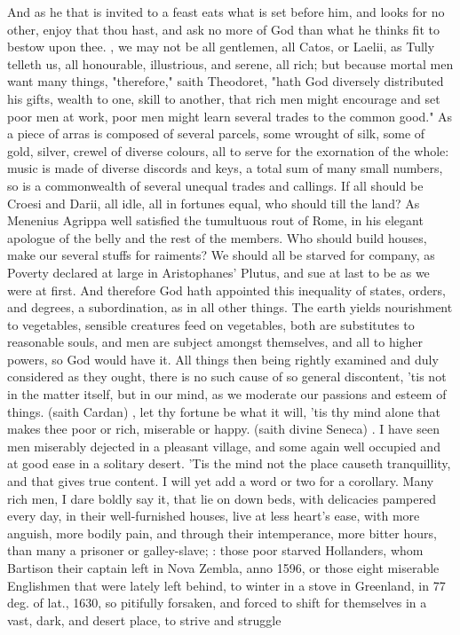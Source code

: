 {And as he that is invited to a feast eats what is set before him, and looks for no other, enjoy that thou hast, and ask no more of God than what he thinks fit to bestow upon thee. , we may not be all gentlemen, all Catos, or Laelii, as Tully telleth us, all honourable, illustrious, and serene, all rich; but because mortal men want many things, "therefore," saith Theodoret, "hath God diversely distributed his gifts, wealth to one, skill to another, that rich men might encourage and set poor men at work, poor men might learn several trades to the common good." As a piece of arras is composed of several parcels, some wrought of silk, some of gold, silver, crewel of diverse colours, all to serve for the exornation of the whole: music is made of diverse discords and keys, a total sum of many small numbers, so is a commonwealth of several unequal trades and callings. If all should be Croesi and Darii, all idle, all in fortunes equal, who should till the land? As Menenius Agrippa well satisfied the tumultuous rout of Rome, in his elegant apologue of the belly and the rest of the members. Who should build houses, make our several stuffs for raiments? We should all be starved for company, as Poverty declared at large in Aristophanes' Plutus, and sue at last to be as we were at first. And therefore God hath appointed this inequality of states, orders, and degrees, a subordination, as in all other things. The earth yields nourishment to vegetables, sensible creatures feed on vegetables, both are substitutes to reasonable souls, and men are subject amongst themselves, and all to higher powers, so God would have it. All things then being rightly examined and duly considered as they ought, there is no such cause of so general discontent, 'tis not in the matter itself, but in our mind, as we moderate our passions and esteem of things.  (saith Cardan) , let thy fortune be what it will, 'tis thy mind alone that makes thee poor or rich, miserable or happy.  (saith divine Seneca) . I have seen men miserably dejected in a pleasant village, and some again well occupied and at good ease in a solitary desert. 'Tis the mind not the place causeth tranquillity, and that gives true content. I will yet add a word or two for a corollary. Many rich men, I dare boldly say it, that lie on down beds, with delicacies pampered every day, in their well-furnished houses, live at less heart's ease, with more anguish, more bodily pain, and through their intemperance, more bitter hours, than many a prisoner or galley-slave; : those poor starved Hollanders, whom Bartison their captain left in Nova Zembla, anno 1596, or those eight miserable Englishmen that were lately left behind, to winter in a stove in Greenland, in 77 deg. of lat., 1630, so pitifully forsaken, and forced to shift for themselves in a vast, dark, and desert place, to strive and struggle }
